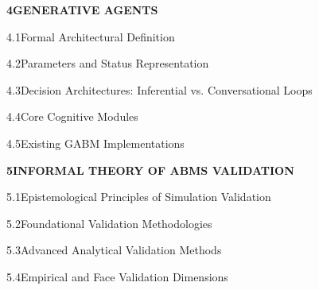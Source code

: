 \documentclass[12pt,a4paper]{report}
\begin{document}
\noindent\textbf{4\quad GENERATIVE AGENTS}\dotfill\textbf{\pageref{chap:generative_agents}}\par
\vspace{3pt}
\noindent\hspace{0.3in}4.1\quad Formal Architectural Definition\dotfill\pageref{sec:ga_def}\par
\vspace{2pt}
\noindent\hspace{0.3in}4.2\quad Parameters and Status Representation\dotfill\pageref{sec:parameters_status}\par
\vspace{2pt}
\noindent\hspace{0.3in}4.3\quad Decision Architectures: Inferential vs. Conversational Loops\dotfill\pageref{sec:feedback_loops}\par
\vspace{2pt}
\noindent\hspace{0.3in}4.4\quad Core Cognitive Modules\dotfill\pageref{sec:cognitive_modules}\par
\vspace{2pt}
\noindent\hspace{0.3in}4.5\quad Existing GABM Implementations\dotfill\pageref{sec:prominent_gabms}\par
\vspace{6pt}

\noindent\textbf{5\quad INFORMAL THEORY OF ABMS VALIDATION}\dotfill\textbf{\pageref{chap:abm_validation}}\par
\vspace{3pt}
\noindent\hspace{0.3in}5.1\quad Epistemological Principles of Simulation Validation\dotfill\pageref{sec:validation_principles}\par
\vspace{2pt}
\noindent\hspace{0.3in}5.2\quad Foundational Validation Methodologies\dotfill\pageref{sec:foundational_val}\par
\vspace{2pt}
\noindent\hspace{0.3in}5.3\quad Advanced Analytical Validation Methods\dotfill\pageref{sec:advanced_val}\par
\vspace{2pt}
\noindent\hspace{0.3in}5.4\quad Empirical and Face Validation Dimensions\dotfill\pageref{sec:empirical_face}\par
\vspace{6pt}
\end{document}
